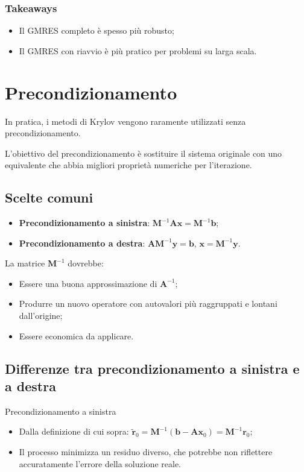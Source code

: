\subsubsection{Takeaways}
\begin{itemize}
	\item Il GMRES completo è spesso più robusto;
	\item Il GMRES con riavvio è più pratico per problemi su larga scala.
\end{itemize}

%
%
%
\section{Precondizionamento}

In pratica, i metodi di Krylov vengono raramente utilizzati senza precondizionamento.

L'obiettivo del precondizionamento è sostituire il sistema originale con uno equivalente che abbia migliori proprietà numeriche per l'iterazione.

%
%
\subsection{Scelte comuni}
\begin{itemize}
	\item \textbf{Precondizionamento a sinistra}: $\mathbf{M}^{-1}\mathbf{A}\mathbf{x} = \mathbf{M}^{-1}\mathbf{b}$;
	\item \textbf{Precondizionamento a destra}: $\mathbf{A}\mathbf{M}^{-1}\mathbf{y} = \mathbf{b}$, $\mathbf{x} = \mathbf{M}^{-1}\mathbf{y}$.
\end{itemize}

La matrice $\mathbf{M}^{-1}$ dovrebbe:
\begin{itemize}
	\item Essere una buona approssimazione di $\mathbf{A}^{-1}$;
	\item Produrre un nuovo operatore con autovalori più raggruppati e lontani dall'origine;
	\item Essere economica da applicare.
\end{itemize}

%
%
\subsection{Differenze tra precondizionamento a sinistra e a destra}

Precondizionamento a sinistra
\begin{itemize}
	\item Dalla definizione di cui sopra: $\tilde{\mathbf{r}}_0 = \mathbf{M}^{-1}(\mathbf{b} - \mathbf{A}\mathbf{x}_0) = \mathbf{M}^{-1}\mathbf{r}_0$;
	\item Il processo minimizza un residuo diverso, che potrebbe non riflettere accuratamente l'errore della soluzione reale.
\end{itemize}

